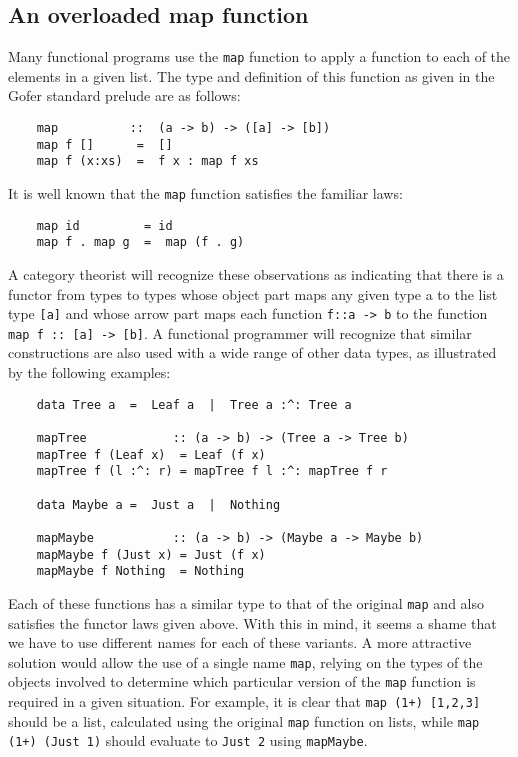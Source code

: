 \subsection{An overloaded map function}
Many functional programs use the \verb"map" function to apply a function to
each of the elements in a given list.  The type and definition of this
function as given in the Gofer standard prelude are as follows:
\begin{verbatim}
    map          ::  (a -> b) -> ([a] -> [b])
    map f []      =  []
    map f (x:xs)  =  f x : map f xs
\end{verbatim}
It is well known that the \verb"map" function satisfies the familiar laws:
\begin{verbatim}
    map id         = id
    map f . map g  =  map (f . g)
\end{verbatim}
A category theorist will recognize these observations as indicating
that there is a functor from types to types whose object part maps any
given type a to the list type \verb"[a]" and whose arrow part maps each
function \verb"f::a -> b" to the function \verb"map f :: [a] -> [b]".  A functional
programmer will recognize that similar constructions are also used with
a wide range of other data types, as illustrated by the following
examples:
\begin{verbatim}
    data Tree a  =  Leaf a  |  Tree a :^: Tree a

    mapTree            :: (a -> b) -> (Tree a -> Tree b)
    mapTree f (Leaf x)  = Leaf (f x)
    mapTree f (l :^: r) = mapTree f l :^: mapTree f r

    data Maybe a =  Just a  |  Nothing

    mapMaybe           :: (a -> b) -> (Maybe a -> Maybe b)
    mapMaybe f (Just x) = Just (f x)
    mapMaybe f Nothing  = Nothing
\end{verbatim}
Each of these functions has a similar type to that of the original \verb"map"
and also satisfies the functor laws given above.  With this in mind, it
seems a shame that we have to use different names for each of these
variants.
A more attractive solution would allow the use of a single name \verb"map",
relying on the types of the objects involved to determine which
particular version of the \verb"map" function is required in a given
situation.  For example, it is clear that \verb"map (1+) [1,2,3]" should be
a list, calculated using the original \verb"map" function on lists, while
\verb"map (1+) (Just 1)" should evaluate to \verb"Just 2" using \verb"mapMaybe".


